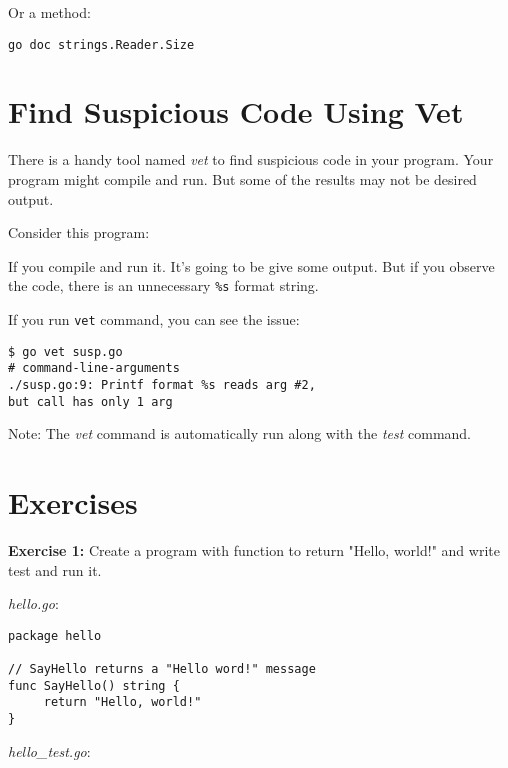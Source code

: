 Or a method:

\begin{lstlisting}[numbers=none]
go doc strings.Reader.Size
\end{lstlisting}

\section{Find Suspicious Code Using Vet}

There is a handy tool named \textit{vet} to find
suspicious code in your program.  Your program might compile and
run. But some of the results may not be desired output.

Consider this program:



If you compile and run it.  It's going to be give some output.  But if
you observe the code, there is an unnecessary \texttt{\%s} format
string.

If you run \texttt{vet} command, you can see the issue:


\begin{lstlisting}[numbers=none]
$ go vet susp.go
# command-line-arguments
./susp.go:9: Printf format %s reads arg #2,
but call has only 1 arg
\end{lstlisting}

Note: The \textit{vet} command is automatically run along with
the \textit{test} command.

\section{Exercises}

\textbf{Exercise 1:} Create a program with function to return "Hello, world!" and
write test and run it.

\textit{hello.go}:

\begin{lstlisting}[numbers=none]
package hello

// SayHello returns a "Hello word!" message
func SayHello() string {
     return "Hello, world!"
}
\end{lstlisting}

\textit{hello\_test.go}:

